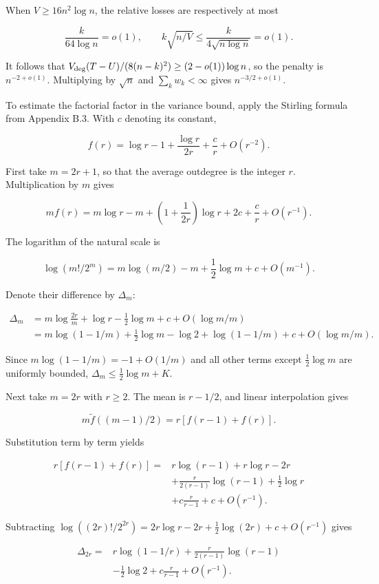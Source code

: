 \documentclass[11pt,a4paper]{article}
\begin{document}
When \(V\ge16n^2\log n\), the relative losses are respectively at most

\[
\frac{k}{64\log n}=o(1),\qquad
k\sqrt{n/V}\le\frac{k}{4\sqrt{n\log n}}=o(1).
\]

It follows that \(V_{\rm deg}(T-U)/(8(n-k)^2)\ge(2-o(1))\log n\), so the penalty is \(n^{-2+o(1)}\). Multiplying by \(\sqrt n\) and \(\sum_kw_k<\infty\) gives \(n^{-3/2+o(1)}\).

To estimate the factorial factor in the variance bound, apply the Stirling formula from Appendix B.3. With \(c\) denoting its constant,

\[
f(r)=\log r-1+\frac{\log r}{2r}+\frac cr+O(r^{-2}).
\]

First take \(m=2r+1\), so that the average outdegree is the integer \(r\). Multiplication by \(m\) gives

\[
mf(r)=m\log r-m+\left(1+\frac1{2r}\right)\log r
+2c+\frac cr+O(r^{-1}).
\]

The logarithm of the natural scale is

\[
\log(m!/2^m)=m\log(m/2)-m+\frac12\log m+c+O(m^{-1}).
\]

Denote their difference by \(\Delta_m\):

\[
\begin{aligned}
\Delta_m
&=m\log\frac{2r}{m}+\log r-\frac12\log m
+c+O(\log m/m)\\
&=m\log(1-1/m)+\frac12\log m-\log2
+\log(1-1/m)+c+O(\log m/m).
\end{aligned}
\]

Since \(m\log(1-1/m)=-1+O(1/m)\) and all other terms except \(\frac12\log m\) are uniformly bounded, \(\Delta_m\le\frac12\log m+K\).

Next take \(m=2r\) with \(r\ge2\). The mean is \(r-1/2\), and linear interpolation gives

\[
m\widetilde f((m-1)/2)=r[f(r-1)+f(r)].
\]

Substitution term by term yields

\[
\begin{aligned}
r[f(r-1)+f(r)]
={}&r\log(r-1)+r\log r-2r\\
&+\frac r{2(r-1)}\log(r-1)+\frac12\log r\\
&+c\frac r{r-1}+c+O(r^{-1}).
\end{aligned}
\]

Subtracting \(\log((2r)!/2^{2r})=2r\log r-2r+\frac12\log(2r)+c+O(r^{-1})\) gives

\[
\begin{aligned}
\Delta_{2r}
={}&r\log(1-1/r)
+\frac r{2(r-1)}\log(r-1)\\
&-\frac12\log2+c\frac r{r-1}+O(r^{-1}).
\end{aligned}
\]
\end{document}
